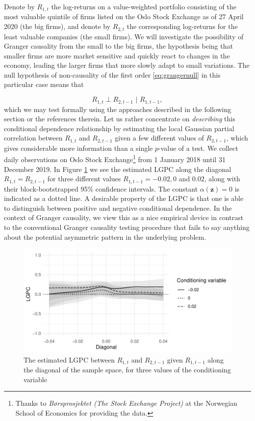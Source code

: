 \documentclass[
  12pt,
  letterpaper]{article}
\newcommand{\z}{\bm{z}}
\theoremstyle{definition}
\theoremstyle{definition}
\theoremstyle{definition}
\theoremstyle{remark}
\begin{document}
Denote by \(R_{1,t}\) the log-returns on a value-weighted portfolio consisting of the most valuable quintile of firms listed on the Oslo Stock Exchange as of 27 April 2020 (the big firms), and denote by \(R_{2,t}\) the corresponding log-returns for the least valuable companies (the small firms). We will investigate the possibility of Granger causality from the small to the big firms, the hypothesis being that smaller firms are more market sensitive and quickly react to changes in the economy, leading the larger firms that more slowly adapt to small variations. The null hypothesis of non-causality of the first order \eqref{eq:grangernull} in this particular case means that

\begin{equation}
R_{1,t} \perp R_{2, t-1} \,\,|\,\, R_{1,t-1},
\end{equation}
which we may test formally using the approaches described in the following section or the references therein. Let us rather concentrate on \emph{describing} this conditional dependence relationship by estimating the local Gaussian partial correlation between \(R_{1,t}\) and \(R_{2,t-1}\) given a few different values of \(R_{2,t-1}\), which gives considerable more information than a single \(p\)-value of a test. We collect daily observations on Oslo Stock Exchange\footnote{Thanks to \emph{Børsprosjektet (The Stock Exchange Project)} at the Norwegian School of Economics for providing the data.} from 1 January 2018 until 31 December 2019. In Figure \ref{fig:order1} we see the estimated LGPC along the diagonal \(R_{1,t} = R_{2,t-1}\) for three different values \(R_{1,t-1} = -0.02, 0\) and \(0.02\), along with their block-bootstrapped 95\% confidence intervals. The constant \(\alpha(\z) = 0\) is indicated as a dotted line. A desirable property of the LGPC is that one is able to distinguish between positive and negative conditional dependence. In the context of Granger causality, we view this as a nice empirical device in contrast to the conventional Granger causality testing procedure that fails to say anything about the potential asymmetric pattern in the underlying problem.

\begin{figure}[t]
\centering
\includegraphics{granger-order1}
\caption{The estimated LGPC between $R_{1,t}$ and $R_{2,t-1}$ given $R_{1,t-1}$ along the diagonal of the sample space, for three values of the conditioning variable}
\label{fig:order1}
\end{figure}
\end{document}
